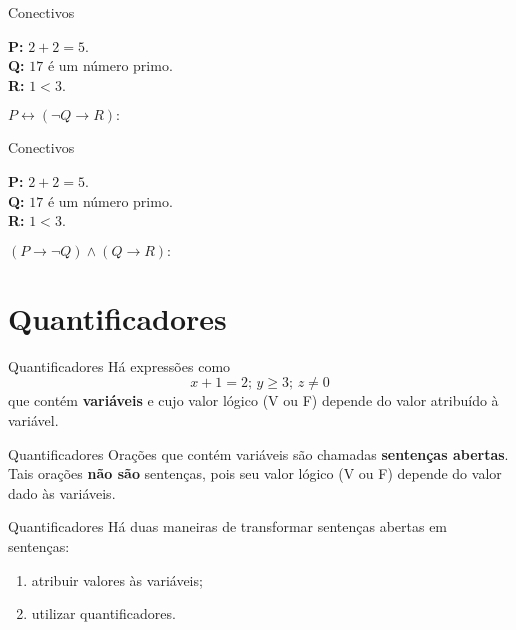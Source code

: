 \documentclass[10pt]{beamer}
\renewcommand{\indent}{\hspace*{2em}}
\theoremstyle{plain}
\begin{document}
\begin{frame}{Conectivos}
    \begin{block}{}
     \textbf{P:} $2+2=5$. \\
     \textbf{Q:} $17$ é um número primo. \\
     \textbf{R:} $1<3$.
    \end{block}  
    $$$$
    $P\leftrightarrow(\neg Q\rightarrow R):$
\end{frame}

\begin{frame}{Conectivos}
    \begin{block}{}
     \textbf{P:} $2+2=5$. \\
     \textbf{Q:} $17$ é um número primo. \\
     \textbf{R:} $1<3$.
    \end{block}  
    $$$$
    $(P\rightarrow \neg Q)\wedge(Q\rightarrow R):$
\end{frame}

\section{Quantificadores}

\begin{frame}{Quantificadores}
    \indent Há expressões como
    $$x+1=2;\,y\ge3;\,z\ne0$$
    que contém \textbf{variáveis} e cujo valor lógico (V ou F) depende do valor atribuído à variável.
\end{frame}

\begin{frame}{Quantificadores}
    \indent Orações que contém variáveis são chamadas \textbf{sentenças abertas}. Tais orações \textbf{não são} sentenças, pois seu valor lógico (V ou F) depende do valor dado às variáveis.
\end{frame}

\begin{frame}{Quantificadores}
    \indent Há duas maneiras de transformar sentenças abertas em sentenças:
    \begin{enumerate}
        \item atribuir valores às variáveis;
        \item utilizar quantificadores.
    \end{enumerate}
\end{frame}
\end{document}
